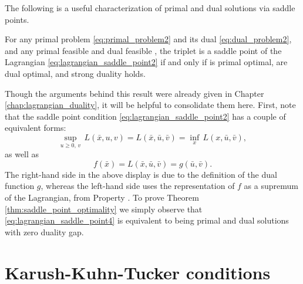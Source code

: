 The following is a useful characterization of primal and dual solutions via
saddle points.  

\begin{Theorem}
\label{thm:saddle_point_optimality}
For any primal problem \eqref{eq:primal_problem2} and its dual
\eqref{eq:dual_problem2}, and any primal feasible  and dual
feasible , the triplet  is a saddle point of the Lagrangian
\eqref{eq:lagrangian_saddle_point2} if and only if  is primal
optimal,  are dual optimal, and strong duality holds. 
\end{Theorem}

Though the arguments behind this result were already given in Chapter 
\ref{chap:lagrangian_duality}, it will be helpful to consolidate them here.
First, note that the saddle point condition
\eqref{eq:lagrangian_saddle_point2} has a couple of equivalent forms:
\begin{equation}
\label{eq:lagrangian_saddle_point3}
\sup_{u \geq 0, \, v} \, L(\bar{x}, u, v) = L(\bar{x}, \bar{u}, \bar{v}) =
\inf_x \, L(x, \bar{u}, \bar{v}), 
\end{equation}
as well as
\begin{equation}
\label{eq:lagrangian_saddle_point4}
f(\bar{x}) = L(\bar{x}, \bar{u}, \bar{v}) = g(\bar{u}, \bar{v}).
\end{equation}
The right-hand side in the above display is due to the definition of the dual
function $g$, whereas the left-hand side uses the representation of $f$ as a
supremum of the Lagrangian, from Property . To prove    
Theorem \ref{thm:saddle_point_optimality} we simply observe that 
\eqref{eq:lagrangian_saddle_point4} is equivalent to  being primal and dual solutions with zero duality gap. 

\section{Karush-Kuhn-Tucker conditions}
\label{sec:kkt_conditions}

